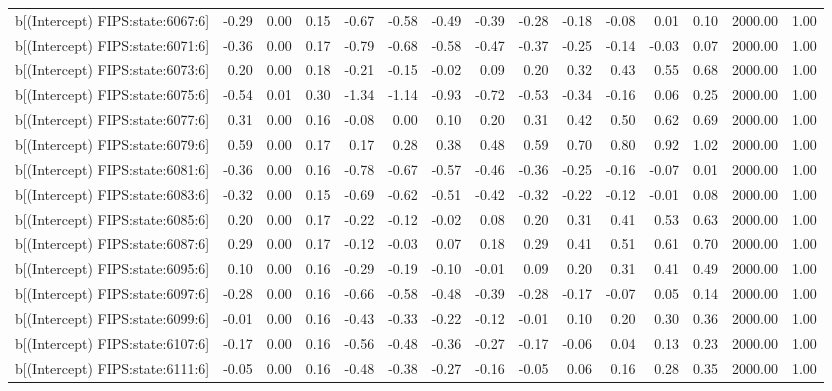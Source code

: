 \begin{table}[ht]
\begin{tabular}{rrrrrrrrrrrrrrr}
  b[(Intercept) FIPS:state:6067:6] & -0.29 & 0.00 & 0.15 & -0.67 & -0.58 & -0.49 & -0.39 & -0.28 & -0.18 & -0.08 & 0.01 & 0.10 & 2000.00 & 1.00 \\ 
  b[(Intercept) FIPS:state:6071:6] & -0.36 & 0.00 & 0.17 & -0.79 & -0.68 & -0.58 & -0.47 & -0.37 & -0.25 & -0.14 & -0.03 & 0.07 & 2000.00 & 1.00 \\ 
  b[(Intercept) FIPS:state:6073:6] & 0.20 & 0.00 & 0.18 & -0.21 & -0.15 & -0.02 & 0.09 & 0.20 & 0.32 & 0.43 & 0.55 & 0.68 & 2000.00 & 1.00 \\ 
  b[(Intercept) FIPS:state:6075:6] & -0.54 & 0.01 & 0.30 & -1.34 & -1.14 & -0.93 & -0.72 & -0.53 & -0.34 & -0.16 & 0.06 & 0.25 & 2000.00 & 1.00 \\ 
  b[(Intercept) FIPS:state:6077:6] & 0.31 & 0.00 & 0.16 & -0.08 & 0.00 & 0.10 & 0.20 & 0.31 & 0.42 & 0.50 & 0.62 & 0.69 & 2000.00 & 1.00 \\ 
  b[(Intercept) FIPS:state:6079:6] & 0.59 & 0.00 & 0.17 & 0.17 & 0.28 & 0.38 & 0.48 & 0.59 & 0.70 & 0.80 & 0.92 & 1.02 & 2000.00 & 1.00 \\ 
  b[(Intercept) FIPS:state:6081:6] & -0.36 & 0.00 & 0.16 & -0.78 & -0.67 & -0.57 & -0.46 & -0.36 & -0.25 & -0.16 & -0.07 & 0.01 & 2000.00 & 1.00 \\ 
  b[(Intercept) FIPS:state:6083:6] & -0.32 & 0.00 & 0.15 & -0.69 & -0.62 & -0.51 & -0.42 & -0.32 & -0.22 & -0.12 & -0.01 & 0.08 & 2000.00 & 1.00 \\ 
  b[(Intercept) FIPS:state:6085:6] & 0.20 & 0.00 & 0.17 & -0.22 & -0.12 & -0.02 & 0.08 & 0.20 & 0.31 & 0.41 & 0.53 & 0.63 & 2000.00 & 1.00 \\ 
  b[(Intercept) FIPS:state:6087:6] & 0.29 & 0.00 & 0.17 & -0.12 & -0.03 & 0.07 & 0.18 & 0.29 & 0.41 & 0.51 & 0.61 & 0.70 & 2000.00 & 1.00 \\ 
  b[(Intercept) FIPS:state:6095:6] & 0.10 & 0.00 & 0.16 & -0.29 & -0.19 & -0.10 & -0.01 & 0.09 & 0.20 & 0.31 & 0.41 & 0.49 & 2000.00 & 1.00 \\ 
  b[(Intercept) FIPS:state:6097:6] & -0.28 & 0.00 & 0.16 & -0.66 & -0.58 & -0.48 & -0.39 & -0.28 & -0.17 & -0.07 & 0.05 & 0.14 & 2000.00 & 1.00 \\ 
  b[(Intercept) FIPS:state:6099:6] & -0.01 & 0.00 & 0.16 & -0.43 & -0.33 & -0.22 & -0.12 & -0.01 & 0.10 & 0.20 & 0.30 & 0.36 & 2000.00 & 1.00 \\ 
  b[(Intercept) FIPS:state:6107:6] & -0.17 & 0.00 & 0.16 & -0.56 & -0.48 & -0.36 & -0.27 & -0.17 & -0.06 & 0.04 & 0.13 & 0.23 & 2000.00 & 1.00 \\ 
  b[(Intercept) FIPS:state:6111:6] & -0.05 & 0.00 & 0.16 & -0.48 & -0.38 & -0.27 & -0.16 & -0.05 & 0.06 & 0.16 & 0.28 & 0.35 & 2000.00 & 1.00 \\ 

\end{tabular}
\end{table}
